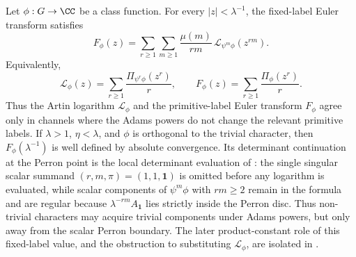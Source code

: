 \begin{theorem}
  \label{thm:fixed-label-euler-transform}
  Let \(\phi:G\to\CC\) be a class function. For every
  \(|z|<\lambda^{-1}\), the fixed-label Euler transform satisfies
  \begin{equation}\label{eq:fixed-label-euler-transform-adams-mobius}
    F_\phi(z)
    =
    \sum_{r\ge1}\sum_{m\ge1}
      \frac{\mu(m)}{rm}\,
      \mathcal L_{\psi^m\phi}(z^{rm}).
  \end{equation}
  Equivalently,
  \begin{equation}\label{eq:fixed-label-euler-transform-vs-artin}
    \mathcal L_\phi(z)
    =
    \sum_{r\ge1}\frac{\Pi_{\psi^r\phi}(z^r)}{r},
    \qquad
    F_\phi(z)
    =
    \sum_{r\ge1}\frac{\Pi_\phi(z^r)}{r}.
  \end{equation}
  Thus the Artin logarithm \(\mathcal L_\phi\) and the primitive-label
  Euler transform \(F_\phi\) agree only in channels where the Adams powers
  do not change the relevant primitive labels. If \(\lambda>1\),
  \(\eta<\lambda\), and \(\phi\) is orthogonal to the trivial character,
  then \(F_\phi(\lambda^{-1})\) is well defined by absolute convergence.
  Its determinant continuation at the Perron point is the local
  determinant evaluation of :
  the single singular scalar summand
  \((r,m,\pi)=(1,1,\mathbf1)\) is omitted before any logarithm is
  evaluated, while scalar components of \(\psi^m\phi\) with \(rm\ge2\)
  remain in the formula and are regular because
  \(\lambda^{-rm}A_{\mathbf1}\) lies strictly inside the Perron disc.
  Thus non-trivial characters may acquire trivial components under Adams
  powers, but only away from the scalar Perron boundary.  The later
  product-constant role of this fixed-label value, and the obstruction to
  substituting \(\mathcal L_\phi\), are isolated in
  .
\end{theorem}

